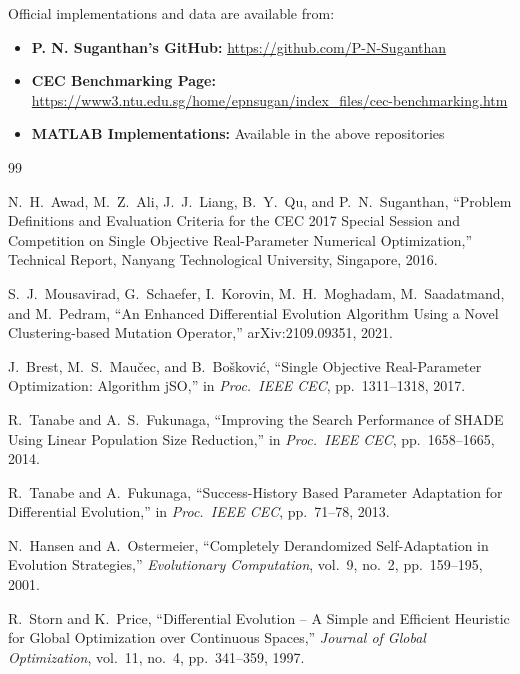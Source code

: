 \documentclass[11pt]{article}
\begin{document}
Official implementations and data are available from:

\begin{itemize}
    \item \textbf{P. N. Suganthan's GitHub:} \url{https://github.com/P-N-Suganthan}
    \item \textbf{CEC Benchmarking Page:} \url{https://www3.ntu.edu.sg/home/epnsugan/index_files/cec-benchmarking.htm}
    \item \textbf{MATLAB Implementations:} Available in the above repositories
\end{itemize}

\begin{thebibliography}{99}

N.~H.~Awad, M.~Z.~Ali, J.~J.~Liang, B.~Y.~Qu, and P.~N.~Suganthan,
``Problem Definitions and Evaluation Criteria for the CEC 2017 Special Session and Competition on Single Objective Real-Parameter Numerical Optimization,''
Technical Report, Nanyang Technological University, Singapore, 2016.

S.~J.~Mousavirad, G.~Schaefer, I.~Korovin, M.~H.~Moghadam, M.~Saadatmand, and M.~Pedram,
``An Enhanced Differential Evolution Algorithm Using a Novel Clustering-based Mutation Operator,''
arXiv:2109.09351, 2021.

J.~Brest, M.~S.~Mau{\v{c}}ec, and B.~Bo{\v{s}}kovi{\'c},
``Single Objective Real-Parameter Optimization: Algorithm jSO,''
in \textit{Proc.~IEEE CEC}, pp.~1311--1318, 2017.

R.~Tanabe and A.~S.~Fukunaga,
``Improving the Search Performance of SHADE Using Linear Population Size Reduction,''
in \textit{Proc.~IEEE CEC}, pp.~1658--1665, 2014.

R.~Tanabe and A.~Fukunaga,
``Success-History Based Parameter Adaptation for Differential Evolution,''
in \textit{Proc.~IEEE CEC}, pp.~71--78, 2013.

N.~Hansen and A.~Ostermeier,
``Completely Derandomized Self-Adaptation in Evolution Strategies,''
\textit{Evolutionary Computation}, vol.~9, no.~2, pp.~159--195, 2001.

R.~Storn and K.~Price,
``Differential Evolution -- A Simple and Efficient Heuristic for Global Optimization over Continuous Spaces,''
\textit{Journal of Global Optimization}, vol.~11, no.~4, pp.~341--359, 1997.


\end{thebibliography}
\end{document}
